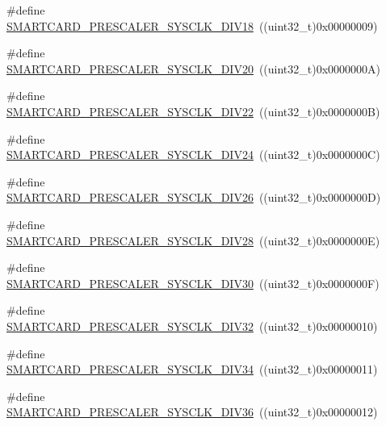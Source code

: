 \begin{DoxyCompactItemize}
\item 
\#define \hyperlink{group___s_m_a_r_t_c_a_r_d___prescaler_gab91052f51eaf60f0c648828a11302912}{S\+M\+A\+R\+T\+C\+A\+R\+D\+\_\+\+P\+R\+E\+S\+C\+A\+L\+E\+R\+\_\+\+S\+Y\+S\+C\+L\+K\+\_\+\+D\+I\+V18}~((uint32\+\_\+t)0x00000009)
\item 
\#define \hyperlink{group___s_m_a_r_t_c_a_r_d___prescaler_ga971e9449ffbbf77b3af90476a0a1f756}{S\+M\+A\+R\+T\+C\+A\+R\+D\+\_\+\+P\+R\+E\+S\+C\+A\+L\+E\+R\+\_\+\+S\+Y\+S\+C\+L\+K\+\_\+\+D\+I\+V20}~((uint32\+\_\+t)0x0000000\+A)
\item 
\#define \hyperlink{group___s_m_a_r_t_c_a_r_d___prescaler_ga2dec7d95a5b341354d9c5fa155f850e3}{S\+M\+A\+R\+T\+C\+A\+R\+D\+\_\+\+P\+R\+E\+S\+C\+A\+L\+E\+R\+\_\+\+S\+Y\+S\+C\+L\+K\+\_\+\+D\+I\+V22}~((uint32\+\_\+t)0x0000000\+B)
\item 
\#define \hyperlink{group___s_m_a_r_t_c_a_r_d___prescaler_gad104b7619272fba937533ade97704a2a}{S\+M\+A\+R\+T\+C\+A\+R\+D\+\_\+\+P\+R\+E\+S\+C\+A\+L\+E\+R\+\_\+\+S\+Y\+S\+C\+L\+K\+\_\+\+D\+I\+V24}~((uint32\+\_\+t)0x0000000\+C)
\item 
\#define \hyperlink{group___s_m_a_r_t_c_a_r_d___prescaler_ga894d1f3838510c0bb96b680aa827bff1}{S\+M\+A\+R\+T\+C\+A\+R\+D\+\_\+\+P\+R\+E\+S\+C\+A\+L\+E\+R\+\_\+\+S\+Y\+S\+C\+L\+K\+\_\+\+D\+I\+V26}~((uint32\+\_\+t)0x0000000\+D)
\item 
\#define \hyperlink{group___s_m_a_r_t_c_a_r_d___prescaler_gaecda56202832f429176829bfa39a94b9}{S\+M\+A\+R\+T\+C\+A\+R\+D\+\_\+\+P\+R\+E\+S\+C\+A\+L\+E\+R\+\_\+\+S\+Y\+S\+C\+L\+K\+\_\+\+D\+I\+V28}~((uint32\+\_\+t)0x0000000\+E)
\item 
\#define \hyperlink{group___s_m_a_r_t_c_a_r_d___prescaler_gae8c19e3d50590cb8adf7d6bb495d8b39}{S\+M\+A\+R\+T\+C\+A\+R\+D\+\_\+\+P\+R\+E\+S\+C\+A\+L\+E\+R\+\_\+\+S\+Y\+S\+C\+L\+K\+\_\+\+D\+I\+V30}~((uint32\+\_\+t)0x0000000\+F)
\item 
\#define \hyperlink{group___s_m_a_r_t_c_a_r_d___prescaler_gaac1f0591b1638b9463f33b03b804d540}{S\+M\+A\+R\+T\+C\+A\+R\+D\+\_\+\+P\+R\+E\+S\+C\+A\+L\+E\+R\+\_\+\+S\+Y\+S\+C\+L\+K\+\_\+\+D\+I\+V32}~((uint32\+\_\+t)0x00000010)
\item 
\#define \hyperlink{group___s_m_a_r_t_c_a_r_d___prescaler_ga65820a7cf55502922c1c1d649320c574}{S\+M\+A\+R\+T\+C\+A\+R\+D\+\_\+\+P\+R\+E\+S\+C\+A\+L\+E\+R\+\_\+\+S\+Y\+S\+C\+L\+K\+\_\+\+D\+I\+V34}~((uint32\+\_\+t)0x00000011)
\item 
\#define \hyperlink{group___s_m_a_r_t_c_a_r_d___prescaler_ga0859cf9103781825104d22ede781bec3}{S\+M\+A\+R\+T\+C\+A\+R\+D\+\_\+\+P\+R\+E\+S\+C\+A\+L\+E\+R\+\_\+\+S\+Y\+S\+C\+L\+K\+\_\+\+D\+I\+V36}~((uint32\+\_\+t)0x00000012)

\end{DoxyCompactItemize}

